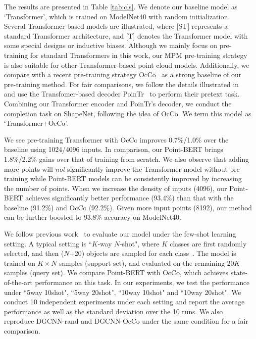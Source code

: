 The results are presented in Table \ref{tab:cls}. We denote our baseline model as  `Transformer', which is trained on ModelNet40  with random initialization.  Several Transformer-based models are illustrated, where [ST] represents a standard Transformer architecture, and [T] denotes the Transformer model with some special designs or inductive biases. Although we mainly focus on pre-training for standard Transformers in this work, our MPM pre-training strategy is also suitable for other Transformer-based point cloud models\cite{guo2021pct,zhao2021point}. Additionally, we compare with a recent pre-training strategy OcCo~\cite{occo}  as a strong baseline of our pre-training method. For fair comparisons, we follow the details illustrated in~\cite{occo} and use the Transfomer-based decoder PoinTr~\cite{yu2021pointr} to perform their pretext task.  Combining our Transformer encoder and PoinTr's decoder, we conduct the completion task on ShapeNet, following the idea of OcCo.  We term this model as `Transformer+OcCo'. 

We see pre-training Transformer with OcCo improves 0.7\%/1.0\% over the baseline using 1024/4096 inputs. In comparison, our Point-BERT brings 1.8\%/2.2\% gains over that of training from scratch. We also observe that adding more points will \textit{not} significantly improve the Transformer model without pre-training while Point-BERT models can be consistently improved by increasing the number of points. When we increase the density of inputs (4096),  our Point-BERT achieves significantly better performance (93.4\%) than that with the baseline (91.2\%) and OcCo (92.2\%).  Given more input points (8192), our method can be further boosted to 93.8\% accuracy on ModelNet40. 
 

We follow previous work~\cite{sharma2020self} to evaluate our model under the few-shot learning setting. A typical setting is “$K$-way $N$-shot", where $K$ classes are first randomly selected, and then ($N$+20) objects are sampled for each class~\cite{sharma2020self}. The model is trained on $K\times N$ samples (support set), and evaluated on the remaining 20$K$ samples (query set). We compare Point-BERT with OcCo\cite{occo}, which achieves state-of-the-art performance on this task. In our experiments, we test the performance under ``5way 10shot", ``5way 20shot", ``10way 10shot" and ``10way 20shot". We conduct 10 independent experiments under each setting and report the average performance as well as the standard deviation over the 10 runs. We also reproduce DGCNN-rand and DGCNN-OcCo under the same condition for a fair comparison.

